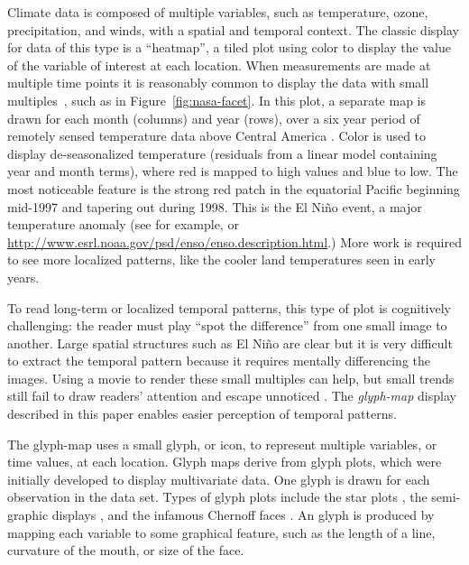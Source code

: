 \documentclass[oneside]{article}
\begin{document}
Climate data is composed of multiple variables, such as temperature, ozone, precipitation, and winds, with a spatial and temporal context. The classic display for data of this type is a ``heatmap'', a tiled plot using color to display the value of the variable of interest at each location. When measurements are made at multiple time points it is reasonably common to display the data with small multiples~\citep{tufte:2001}, such as in Figure~\ref{fig:nasa-facet}. In this plot, a separate map is drawn for each month (columns) and year (rows), over a six year period of remotely sensed temperature data above Central America \citep{murrell:2010}. Color is used to display de-seasonalized temperature (residuals from a linear model containing year and month terms), where red is mapped to high values and blue to low. The most noticeable feature is the strong red patch in the equatorial Pacific beginning mid-1997 and tapering out during 1998. This is the El Ni\~no event, a major temperature anomaly (see for example, \citet{trenberth} or \url{http://www.esrl.noaa.gov/psd/enso/enso.description.html}.) More work is required to see more localized patterns, like the cooler land temperatures seen in early years.

To read long-term or localized temporal patterns, this type of plot is cognitively challenging: the reader must play ``spot the difference'' from one small image to another. Large spatial structures such as El Ni\~no are clear but it is very difficult to extract the temporal pattern because it requires mentally differencing the images. Using a movie to render these small multiples can help, but small trends still fail to draw readers' attention and escape unnoticed \citep{simons:gradual}. The \emph{glyph-map} display described in this paper enables easier perception of temporal patterns. 


The glyph-map uses a small glyph, or icon, to represent multiple variables, or time values, at each location. Glyph maps derive from glyph plots, which were initially developed to display multivariate data. One glyph is drawn for each observation in the data set. Types of glyph plots include the star plots \citep{mayr:1877, FD01, kleiner:1981}, the semi-graphic displays \citep{anderson:1960}, and the infamous Chernoff faces \citep{chernoff:1973}. An glyph is produced by mapping each variable to some graphical feature, such as the length of a line, curvature of the mouth, or size of the face. 
\end{document}
